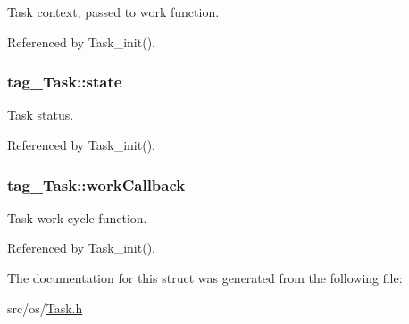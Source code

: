 Task context, passed to work function. 



Referenced by Task\+\_\+init().

\hypertarget{structtag___task_a9c1ed76fb17998c5d0eaea9476aca301}{
\subsubsection[{state}]{ tag\+\_\+\+Task\+::state}}\label{structtag___task_a9c1ed76fb17998c5d0eaea9476aca301}


Task status. 



Referenced by Task\+\_\+init().

\hypertarget{structtag___task_ad633bdb373da2f8a144e8a7927cb3630}{
\subsubsection[{work\+Callback}]{ tag\+\_\+\+Task\+::work\+Callback}}\label{structtag___task_ad633bdb373da2f8a144e8a7927cb3630}


Task work cycle function. 



Referenced by Task\+\_\+init().



The documentation for this struct was generated from the following file\+:\begin{DoxyCompactItemize}
\item 
src/os/\hyperlink{_task_8h}{Task.\+h}\end{DoxyCompactItemize}

